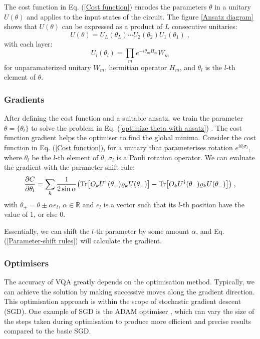 The cost function in Eq. (\ref{Cost function}) encodes the parameters $\theta$ in a unitary $U(\theta)$ and applies to the input states of the circuit.
The figure \ref{Ansatz diagram} shows that $U(\theta)$ can be expressed as a product of $L$ consecutive unitaries:
\begin{equation}
    U(\theta) = U_L(\theta_L) \cdots U_2(\theta_2) U_1(\theta_1)\;,
\end{equation}
with each layer:
\begin{equation}
    U_l(\theta_l) = \prod_m e^{-i\theta_m H_m} W_m
\end{equation}
for unparamaterized unitary $W_m$, hermitian operator $H_m$, and $\theta_l$ is the $l$-th element of $\theta$.

\subsubsection{Gradients}
After defining the cost function and a suitable ansatz, we train the parameter $\theta = \{\theta_{l}\}$ to solve the problem in Eq. (\ref{optimize theta with ansatz}) \cite{cerezo2021variational}.
The cost function gradient helps the optimiser to find the global minima.
Consider the cost function in Eq. (\ref{Cost function}), for a unitary that parameterises rotation $e^{i \theta_l \sigma_{l}}$, where $\theta_l$ be the $l$-th element of $\theta$, $\sigma_l$ is a Pauli rotation operator.
We can evaluate the gradient with the parameter-shift rule:
\begin{equation}
    \frac{\partial C}{\partial\theta_l}
    = \sum_k \frac{1}{2 \sin{\alpha}}
    \left(
    \Tr[O_k U^\dagger(\theta_+) \rho_k U(\theta_+)]
    - \Tr[O_k U^\dagger(\theta_-) \rho_k U(\theta_-)]
    \right) \;,
    \label{Parameter-shift rules}
\end{equation}
with $\theta_{\pm} = \theta \pm \alpha e_l$, $\alpha \in \mathbb{R}$ and $e_l$ is a vector such that its $l$-th position have the value of 1, or else 0.

Essentially, we can shift the $l$-th parameter by some amount $\alpha$, and Eq. (\ref{Parameter-shift rules}) will calculate the gradient.


\subsubsection{Optimisers}
The accuracy of VQA greatly depends on the optimisation method.
Typically, we can achieve the solution by making successive moves along the gradient direction.
This optimisation approach is within the scope of stochastic gradient descent (SGD).
One example of SGD is the ADAM optimiser \cite{kingmaAdamMethodStochastic2014}, which can vary the size of the steps taken during optimisation to produce more efficient and precise results compared to the basic SGD.


